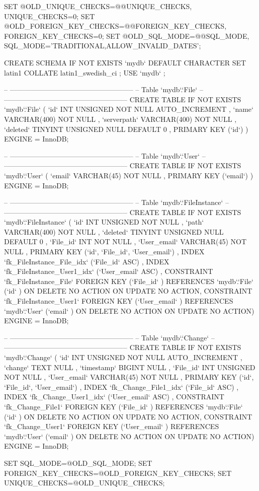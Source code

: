 SET @OLD_UNIQUE_CHECKS=@@UNIQUE_CHECKS, UNIQUE_CHECKS=0;
SET @OLD_FOREIGN_KEY_CHECKS=@@FOREIGN_KEY_CHECKS, FOREIGN_KEY_CHECKS=0;
SET @OLD_SQL_MODE=@@SQL_MODE, SQL_MODE='TRADITIONAL,ALLOW_INVALID_DATES';

CREATE SCHEMA IF NOT EXISTS `mydb` DEFAULT CHARACTER SET latin1 COLLATE latin1_swedish_ci ;
USE `mydb` ;

-- -----------------------------------------------------
-- Table `mydb`.`File`
-- -----------------------------------------------------
CREATE  TABLE IF NOT EXISTS `mydb`.`File` (
  `id` INT UNSIGNED NOT NULL AUTO_INCREMENT ,
  `name` VARCHAR(400) NOT NULL ,
  `serverpath` VARCHAR(400) NOT NULL ,
  `deleted` TINYINT UNSIGNED NULL DEFAULT 0 ,
  PRIMARY KEY (`id`) )
ENGINE = InnoDB;


-- -----------------------------------------------------
-- Table `mydb`.`User`
-- -----------------------------------------------------
CREATE  TABLE IF NOT EXISTS `mydb`.`User` (
  `email` VARCHAR(45) NOT NULL ,
  PRIMARY KEY (`email`) )
ENGINE = InnoDB;


-- -----------------------------------------------------
-- Table `mydb`.`FileInstance`
-- -----------------------------------------------------
CREATE  TABLE IF NOT EXISTS `mydb`.`FileInstance` (
  `id` INT UNSIGNED NOT NULL ,
  `path` VARCHAR(400) NOT NULL ,
  `deleted` TINYINT UNSIGNED NULL DEFAULT 0 ,
  `File_id` INT NOT NULL ,
  `User_email` VARCHAR(45) NOT NULL ,
  PRIMARY KEY (`id`, `File_id`, `User_email`) ,
  INDEX `fk_FileInstance_File_idx` (`File_id` ASC) ,
  INDEX `fk_FileInstance_User1_idx` (`User_email` ASC) ,
  CONSTRAINT `fk_FileInstance_File`
    FOREIGN KEY (`File_id` )
    REFERENCES `mydb`.`File` (`id` )
    ON DELETE NO ACTION
    ON UPDATE NO ACTION,
  CONSTRAINT `fk_FileInstance_User1`
    FOREIGN KEY (`User_email` )
    REFERENCES `mydb`.`User` (`email` )
    ON DELETE NO ACTION
    ON UPDATE NO ACTION)
ENGINE = InnoDB;


-- -----------------------------------------------------
-- Table `mydb`.`Change`
-- -----------------------------------------------------
CREATE  TABLE IF NOT EXISTS `mydb`.`Change` (
  `id` INT UNSIGNED NOT NULL AUTO_INCREMENT ,
  `change` TEXT NULL ,
  `timestamp` BIGINT NULL ,
  `File_id` INT UNSIGNED NOT NULL ,
  `User_email` VARCHAR(45) NOT NULL ,
  PRIMARY KEY (`id`, `File_id`, `User_email`) ,
  INDEX `fk_Change_File1_idx` (`File_id` ASC) ,
  INDEX `fk_Change_User1_idx` (`User_email` ASC) ,
  CONSTRAINT `fk_Change_File1`
    FOREIGN KEY (`File_id` )
    REFERENCES `mydb`.`File` (`id` )
    ON DELETE NO ACTION
    ON UPDATE NO ACTION,
  CONSTRAINT `fk_Change_User1`
    FOREIGN KEY (`User_email` )
    REFERENCES `mydb`.`User` (`email` )
    ON DELETE NO ACTION
    ON UPDATE NO ACTION)
ENGINE = InnoDB;



SET SQL_MODE=@OLD_SQL_MODE;
SET FOREIGN_KEY_CHECKS=@OLD_FOREIGN_KEY_CHECKS;
SET UNIQUE_CHECKS=@OLD_UNIQUE_CHECKS;
